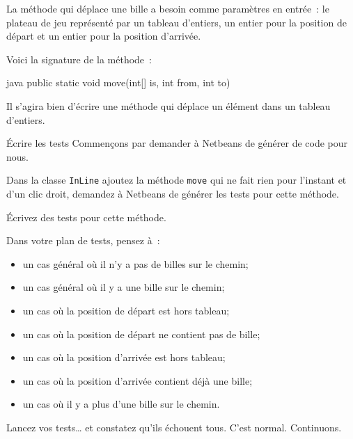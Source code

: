 \documentclass[a4paper,11pt]{style-esi/td}
\begin{document}
La méthode  qui déplace une bille a besoin comme paramètres en
entrée~: le plateau de jeu représenté par un tableau d'entiers, un entier pour
la position de départ et un entier pour la position d'arrivée. 

Voici la signature de la méthode~:

\begin{Code}{java}
	public static void move(int[] is, int from, int to)
\end{Code}

Il s'agira bien d'écrire une méthode qui déplace un élément dans un tableau
d'entiers. 

\pagebreak
\begin{Exercice}{Écrire les tests}
	Commençons par demander à Netbeans de générer de code pour nous. 

	\begin{steps}		
		\item Dans la classe \texttt{InLine} ajoutez la méthode \texttt{move}
			qui ne fait rien pour l'instant et d'un clic droit, demandez
			à Netbeans de générer les tests pour cette méthode. 

		\item Écrivez des tests pour cette méthode.
	\end{steps}

Dans votre plan de tests, pensez à~:

\begin{itemize}
	\item un cas général où il n'y a pas de billes sur le chemin;
	\item un cas général où il y a une bille sur le chemin;
	\item un cas où la position de départ est hors tableau;
	\item un cas où la position de départ ne contient pas de bille;
	\item un cas où la position d'arrivée est hors tableau;
	\item un cas où la position d'arrivée contient déjà une bille;
	\item un cas où il y a plus d'une bille sur le chemin.
\end{itemize}

\end{Exercice}

Lancez vos tests… et constatez qu'ils échouent tous. C'est normal. Continuons. 
\end{document}
